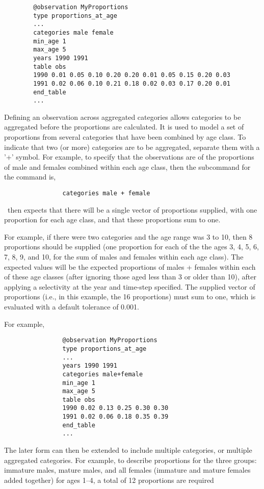 {\small{\begin{verbatim}
		@observation MyProportions
		type proportions_at_age
		...
		categories male female
		min_age 1
		max_age 5
		years 1990 1991
		table obs
		1990 0.01 0.05 0.10 0.20 0.20 0.01 0.05 0.15 0.20 0.03
		1991 0.02 0.06 0.10 0.21 0.18 0.02 0.03 0.17 0.20 0.01
		end_table
		...
		\end{verbatim}
		
		
Defining an observation across aggregated categories allows categories to be aggregated before the proportions are calculated. It is used to model a set of proportions from several categories that have been combined by age class. To indicate that two (or more) categories are to be aggregated, separate them with a '+' symbol. For example, to specify that the observations are of the proportions of male and females combined within each age class, then the subcommand  for the  command is,
		
		{\small{\begin{verbatim}
				categories male + female
				\end{verbatim}}}
		
\CNAME\ then expects that there will be a single vector of proportions supplied, with one proportion for each age class, and that these proportions sum to one. 
		
For example, if there were two categories and the age range was 3 to 10, then 8 proportions should be supplied (one proportion for each of the the ages 3, 4, 5, 6, 7, 8, 9, and 10, for the sum of males and females within each age class). The expected values will be the expected proportions of males + females within each of these age classes (after ignoring those aged less than 3 or older than 10), after applying a selectivity at the year and time-step specified. The supplied vector of proportions (i.e., in this example, the 16 proportions) must sum to one, which is evaluated with a default tolerance of 0.001. 
		
For example,
		
{\small{\begin{verbatim}
				@observation MyProportions
				type proportions_at_age 
				...
				years 1990 1991
				categories male+female
				min_age 1
				max_age 5
				table obs
				1990 0.02 0.13 0.25 0.30 0.30
				1991 0.02 0.06 0.18 0.35 0.39
				end_table
				...
				\end{verbatim}
				
The later form can then be extended to include multiple categories, or multiple aggregated categories. For example, to describe proportions for the three groups: immature males, mature males, and all females (immature and mature females added together) for ages 1--4, a total of 12 proportions are required 
				
}}}}
